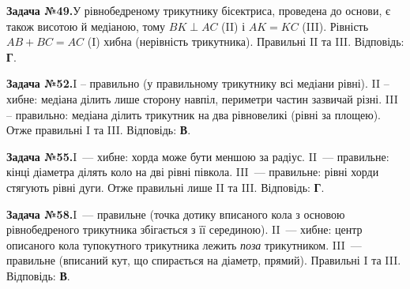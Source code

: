 \documentclass[12pt]{article}
\begin{document}
\begin{tcolorbox}[colback=titleBg!40, colframe=mainGreen!55, boxrule=0.4pt, arc=2pt, left=6pt, right=6pt, top=4pt, bottom=4pt, breakable]
\noindent\small\textbf{Задача №49.}\quad У рівнобедреному трикутнику бісектриса, проведена до основи, є також висотою й медіаною, тому $BK\perp AC$ (II) і $AK=KC$ (III). Рівність $AB+BC=AC$ (I) хибна (нерівність трикутника). Правильні II та III. Відповідь: \textbf{Г}.
\par\vspace{0.1cm}\hfill\hyperlink{task:49}{}
\end{tcolorbox}
\par\vspace{0.3cm}\noindent\hypertarget{sol:52}{}
\begin{tcolorbox}[colback=titleBg!40, colframe=mainGreen!55, boxrule=0.4pt, arc=2pt, left=6pt, right=6pt, top=4pt, bottom=4pt, breakable]
\noindent\small\textbf{Задача №52.}\quad I -- правильно (у правильному трикутнику всі медіани рівні). II -- хибне: медіана ділить лише сторону навпіл, периметри частин зазвичай різні. III -- правильно: медіана ділить трикутник на два рівновеликі (рівні за площею). Отже правильні I та III. Відповідь: \textbf{В}.
\par\vspace{0.1cm}\hfill\hyperlink{task:52}{}
\end{tcolorbox}
\par\vspace{0.3cm}\noindent\hypertarget{sol:55}{}
\begin{tcolorbox}[colback=titleBg!40, colframe=mainGreen!55, boxrule=0.4pt, arc=2pt, left=6pt, right=6pt, top=4pt, bottom=4pt, breakable]
\noindent\small\textbf{Задача №55.}\quad I~--- хибне: хорда може бути меншою за радіус. II~--- правильне: кінці діаметра ділять коло на дві рівні півкола. III~--- правильне: рівні хорди стягують рівні дуги. Отже правильні лише II та III. Відповідь: \textbf{Г}.
\par\vspace{0.1cm}\hfill\hyperlink{task:55}{}
\end{tcolorbox}
\par\vspace{0.3cm}\noindent\hypertarget{sol:58}{}
\begin{tcolorbox}[colback=titleBg!40, colframe=mainGreen!55, boxrule=0.4pt, arc=2pt, left=6pt, right=6pt, top=4pt, bottom=4pt, breakable]
\noindent\small\textbf{Задача №58.}\quad I~--- правильне (точка дотику вписаного кола з основою рівнобедреного трикутника збігається з її серединою). II~--- хибне: центр описаного кола тупокутного трикутника лежить \emph{поза} трикутником. III~--- правильне (вписаний кут, що спирається на діаметр, прямий). Правильні I та III. Відповідь: \textbf{В}.
\par\vspace{0.1cm}\hfill\hyperlink{task:58}{}
\end{tcolorbox}
\end{document}
